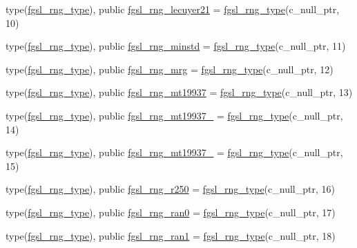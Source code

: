 \begin{DoxyCompactItemize}
\item 
type(\hyperlink{structfgsl_1_1fgsl__rng__type}{fgsl\+\_\+rng\+\_\+type}), public \hyperlink{namespacefgsl_a636f91cce473d59c5b32c77a329f4486}{fgsl\+\_\+rng\+\_\+lecuyer21} = \hyperlink{structfgsl_1_1fgsl__rng__type}{fgsl\+\_\+rng\+\_\+type}(c\+\_\+null\+\_\+ptr, 10)
\item 
type(\hyperlink{structfgsl_1_1fgsl__rng__type}{fgsl\+\_\+rng\+\_\+type}), public \hyperlink{namespacefgsl_a9bc7cd5586595c2ac502e3f6496869a9}{fgsl\+\_\+rng\+\_\+minstd} = \hyperlink{structfgsl_1_1fgsl__rng__type}{fgsl\+\_\+rng\+\_\+type}(c\+\_\+null\+\_\+ptr, 11)
\item 
type(\hyperlink{structfgsl_1_1fgsl__rng__type}{fgsl\+\_\+rng\+\_\+type}), public \hyperlink{namespacefgsl_a598ecc30ecba7ed571bf0d76f66cc23f}{fgsl\+\_\+rng\+\_\+mrg} = \hyperlink{structfgsl_1_1fgsl__rng__type}{fgsl\+\_\+rng\+\_\+type}(c\+\_\+null\+\_\+ptr, 12)
\item 
type(\hyperlink{structfgsl_1_1fgsl__rng__type}{fgsl\+\_\+rng\+\_\+type}), public \hyperlink{namespacefgsl_ac85f5a9aab93968683416a0bf672122d}{fgsl\+\_\+rng\+\_\+mt19937} = \hyperlink{structfgsl_1_1fgsl__rng__type}{fgsl\+\_\+rng\+\_\+type}(c\+\_\+null\+\_\+ptr, 13)
\item 
type(\hyperlink{structfgsl_1_1fgsl__rng__type}{fgsl\+\_\+rng\+\_\+type}), public \hyperlink{namespacefgsl_a9e349dde1852d8ef9eb4bbdcc9de661a}{fgsl\+\_\+rng\+\_\+mt19937\+\_} = \hyperlink{structfgsl_1_1fgsl__rng__type}{fgsl\+\_\+rng\+\_\+type}(c\+\_\+null\+\_\+ptr, 14)
\item 
type(\hyperlink{structfgsl_1_1fgsl__rng__type}{fgsl\+\_\+rng\+\_\+type}), public \hyperlink{namespacefgsl_a984a8a295a9ec6b581b70421f780df53}{fgsl\+\_\+rng\+\_\+mt19937\+\_} = \hyperlink{structfgsl_1_1fgsl__rng__type}{fgsl\+\_\+rng\+\_\+type}(c\+\_\+null\+\_\+ptr, 15)
\item 
type(\hyperlink{structfgsl_1_1fgsl__rng__type}{fgsl\+\_\+rng\+\_\+type}), public \hyperlink{namespacefgsl_ada1200ead9fd55af5e211bdd3666dea1}{fgsl\+\_\+rng\+\_\+r250} = \hyperlink{structfgsl_1_1fgsl__rng__type}{fgsl\+\_\+rng\+\_\+type}(c\+\_\+null\+\_\+ptr, 16)
\item 
type(\hyperlink{structfgsl_1_1fgsl__rng__type}{fgsl\+\_\+rng\+\_\+type}), public \hyperlink{namespacefgsl_a355fcde51e3f3a5d6ad8ea548e7cdb0c}{fgsl\+\_\+rng\+\_\+ran0} = \hyperlink{structfgsl_1_1fgsl__rng__type}{fgsl\+\_\+rng\+\_\+type}(c\+\_\+null\+\_\+ptr, 17)
\item 
type(\hyperlink{structfgsl_1_1fgsl__rng__type}{fgsl\+\_\+rng\+\_\+type}), public \hyperlink{namespacefgsl_a4b91ddd8f42db11c9ae467f1b8fbe5f2}{fgsl\+\_\+rng\+\_\+ran1} = \hyperlink{structfgsl_1_1fgsl__rng__type}{fgsl\+\_\+rng\+\_\+type}(c\+\_\+null\+\_\+ptr, 18)

\end{DoxyCompactItemize}
